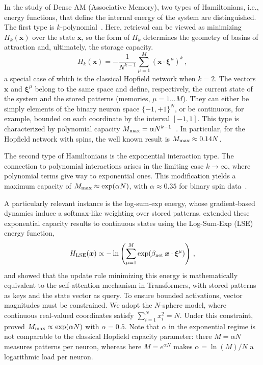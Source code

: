 \documentclass{article}
\theoremstyle{plain}
\theoremstyle{definition}
\theoremstyle{remark}
\begin{document}
In the study of Dense AM (Associative Memory), two types of Hamiltonians, i.e., energy functions, that define the internal energy of the system are distinguished.  The first type is $k$-polynomial~\cite{krotov2016dense}. Here, retrieval can be viewed as minimizing $H_k(\bm{x})$ over the state $\bm{x}$, so the form of $H_k$ determines the geometry of basins of attraction and, ultimately, the storage capacity.
\begin{equation}
    H_k(\bm{x}) = - \frac{1}{N^{k-1}} \sum\limits_{\mu=1}^{M} (\bm{x} \cdot \bm{\xi}^\mu)^k\,,
    \label{eq:H_k}
\end{equation}
a special case of which is the classical Hopfield network \cite{Hopfield1982} when $k=2$. 
The vectors $\bm{x}$ and $\bm{\xi}^\mu$ belong to the same space and define, respectively, the current state of the system and the stored patterns (memories, $\mu=1\dots M$). They can either be simply elements of the binary neuron space $\{-1,+1\}^N$, or be continuous, for example, bounded on each coordinate by the interval $[-1, 1]$. This type is characterized by polynomial capacity $M_{\rm max} = \alpha N^{k-1}$~\cite{krotov2016dense}. In particular, for the Hopfield network with spins, the well known result is $M_{\rm max} \approx 0.14N$.

The second type of Hamiltonians is the exponential interaction type. The connection to polynomial interactions arises in the limiting case $k \to \infty$, where polynomial terms give way to exponential ones. This modification yields a maximum capacity of $M_{\rm max} \approx \exp(\alpha N)$, with $\alpha \approx 0.35$ for binary spin data~\cite{demircigil2017model}.

A particularly relevant instance is the log-sum-exp energy, whose gradient-based dynamics induce a softmax-like weighting over stored patterns.
\citet{ramsauer2021hopfield} extended these exponential capacity results to continuous states using the Log-Sum-Exp (LSE) energy function,
\begin{equation}
    H_{\rm LSE}(\bm{x}) \propto -\ln \left( \sum_{\mu=1}^M \exp(\beta_{\rm net} \, \bm{x} \cdot \bm{\xi}^\mu) \right) \,,
    \label{eq:lse_energy}
\end{equation}
and showed that the update rule minimizing this energy is mathematically equivalent to the self-attention mechanism in Transformers, with stored patterns as keys and the state vector as query. To ensure bounded activations, vector magnitudes must be constrained. We adopt the $N$-sphere model, where continuous real-valued coordinates satisfy $\sum_{i=1}^{N} x_i^2 = N$. Under this constraint, \citet{ramsauer2021hopfield} proved $M_{\rm max} \propto \exp(\alpha N)$ with $\alpha = 0.5$. Note that $\alpha$ in the exponential regime is not comparable to the classical Hopfield capacity parameter: there $M = \alpha N$ measures patterns per neuron, whereas here $M = e^{\alpha N}$ makes $\alpha = \ln(M)/N$ a logarithmic load per neuron.
\end{document}
